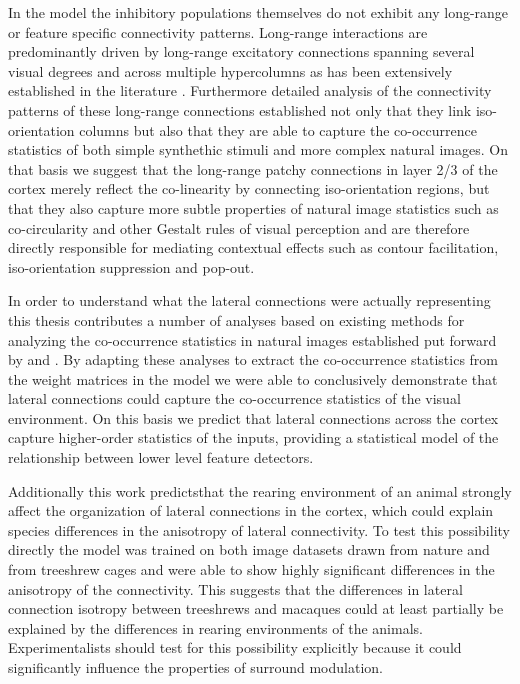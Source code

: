 In the model the inhibitory populations themselves do not exhibit any
long-range or feature specific connectivity patterns. Long-range
interactions are predominantly driven by long-range excitatory
connections spanning several visual degrees and across multiple
hypercolumns as has been extensively established in the literature
\citep{Weliky1995, Bair2003}. Furthermore detailed analysis of the
connectivity patterns of these long-range connections established not
only that they link iso-orientation columns but also that they are
able to capture the co-occurrence statistics of both simple synthethic
stimuli and more complex natural images. On that basis we suggest that
the long-range patchy connections in layer 2/3 of the cortex merely
reflect the co-linearity by connecting iso-orientation regions, but
that they also capture more subtle properties of natural image
statistics such as co-circularity and other Gestalt rules of visual
perception and are therefore directly responsible for mediating
contextual effects such as contour facilitation, iso-orientation
suppression and pop-out.

In order to understand what the lateral connections were actually
representing this thesis contributes a number of analyses based on
existing methods for analyzing the co-occurrence statistics in natural
images established put forward by \cite{Geisler2001} and
\cite{Perrinet2015}. By adapting these analyses to extract the
co-occurrence statistics from the weight matrices in the model we were
able to conclusively demonstrate that lateral connections could
capture the co-occurrence statistics of the visual environment. On
this basis we predict that lateral connections across the cortex
capture higher-order statistics of the inputs, providing a statistical
model of the relationship between lower level feature detectors.

Additionally this work predictsthat the rearing environment of an
animal strongly affect the organization of lateral connections in the
cortex, which could explain species differences in the anisotropy of
lateral connectivity. To test this possibility directly the model was
trained on both image datasets drawn from nature and from treeshrew
cages and were able to show highly significant differences in the
anisotropy of the connectivity. This suggests that the differences in
lateral connection isotropy between treeshrews \citep{Bosking1997} and
macaques \citep{Angelucci2002} could at least partially be explained
by the differences in rearing environments of the
animals. Experimentalists should test for this possibility explicitly
because it could significantly influence the properties of surround
modulation.

